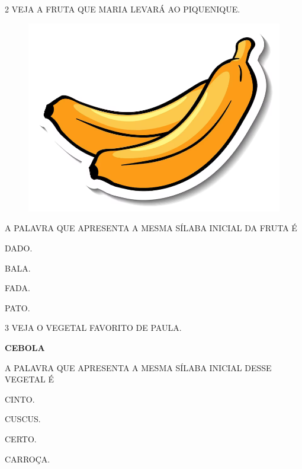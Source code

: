 \num{2} VEJA A FRUTA QUE MARIA LEVARÁ AO PIQUENIQUE.

\begin{figure}[H]
\centering
\includegraphics[width=\textwidth]{./media/image72.png}
\end{figure}

A PALAVRA QUE APRESENTA A MESMA SÍLABA INICIAL DA FRUTA É

\begin{escolha}

\item DADO.

\item BALA.

\item FADA.

\item PATO.

\end{escolha}

\num{3} VEJA O VEGETAL FAVORITO DE PAULA.

\begin{center}
\textbf{CEBOLA}
\end{center}

A PALAVRA QUE APRESENTA A MESMA SÍLABA INICIAL DESSE VEGETAL É

\begin{escolha}

\item CINTO.

\item CUSCUS.

\item CERTO.

\item CARROÇA.

\end{escolha}

